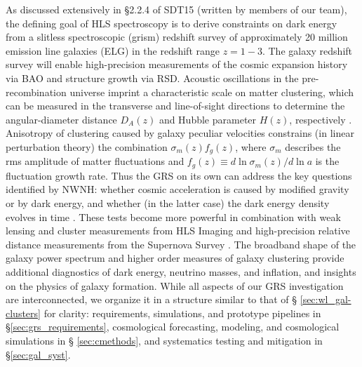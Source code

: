 As discussed extensively in \S 2.2.4 of SDT15 (written by
members of our team), the defining goal of HLS spectroscopy is to derive
constraints on dark energy from a slitless spectroscopic (grism)
redshift survey of approximately 20 million emission line galaxies (ELG) in the redshift range $z=1-3$.
The galaxy redshift survey will enable high-precision measurements of the cosmic expansion history via BAO and structure growth via RSD.
Acoustic oscillations in the pre-recombination universe imprint a characteristic scale on matter clustering, which
can be measured in the transverse and line-of-sight directions to
determine the angular-diameter distance $D_A(z)$ and Hubble parameter $H(z)$, respectively \cite{Blake03,Seo03,CW12}.  Anisotropy of clustering
caused by galaxy peculiar velocities constrains (in linear perturbation
theory) the combination $\sigma_m(z) f_g(z)$, where $\sigma_m$ describes
the rms amplitude of matter fluctuations and $f_g(z) \equiv d\ln\sigma_m(z)/d\ln a$ is the fluctuation growth rate.
Thus the GRS on its own can address the key questions identified by
NWNH: whether cosmic acceleration is caused by modified gravity
or by dark energy, and whether (in the latter case) the dark energy
density evolves in time \cite{Guzzo08,Wang08}.  These tests become more powerful in
combination with weak lensing and cluster measurements from HLS Imaging
and high-precision relative distance measurements from the Supernova
Survey \cite{dePutter:2013xda,dePutter:2013nha}. The broadband shape of the galaxy power spectrum and higher order
measures of galaxy clustering provide additional diagnostics of
dark energy, neutrino masses, and inflation, and insights on the physics of galaxy formation.
While all aspects of our GRS investigation are interconnected, we
organize it in a structure similar to that of \S
\ref{sec:wl_gal-clusters} for clarity: requirements, simulations, and prototype pipelines in \S \ref{sec:grs_requirements},
cosmological forecasting, modeling, and cosmological simulations in \S
\ref{sec:cmethods}, and systematics testing and mitigation in \S \ref{sec:gal_syst}.



